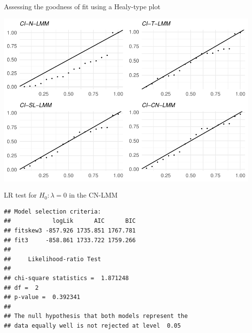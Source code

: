 \begin{frame}[fragile]{Assessing the goodness of fit using a Healy-type
plot}
\protect\hypertarget{assessing-the-goodness-of-fit-using-a-healy-type-plot}{}

\scriptsize

\begin{Shaded}
\begin{Highlighting}[]
\NormalTok{(}
\end{Highlighting}
\end{Shaded}

\begin{center}\includegraphics[width=0.75\linewidth]{codes_files/figure-beamer/healy1-1} \end{center}

\end{frame}

\begin{frame}[fragile]{LR test for \(H_0: \lambda=0\) in the CN-LMM}
\protect\hypertarget{lr-test-for-h_0-lambda0-in-the-cn-lmm}{}

\small

\begin{Shaded}
\begin{Highlighting}[]
\end{Highlighting}
\end{Shaded}

\begin{verbatim}
## Model selection criteria:
##            logLik      AIC      BIC
## fitskew3 -857.926 1735.851 1767.781
## fit3     -858.861 1733.722 1759.266
## 
##     Likelihood-ratio Test
## 
## chi-square statistics =  1.871248 
## df =  2 
## p-value =  0.392341 
## 
## The null hypothesis that both models represent the 
## data equally well is not rejected at level  0.05
\end{verbatim}

\end{frame}

